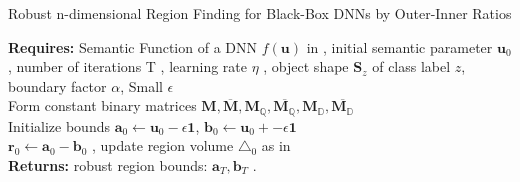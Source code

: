 \begin{algorithm}[t] 
\caption{Robust n-dimensional Region Finding for Black-Box DNNs by Outer-Inner Ratios}\label{alg: black}
\small
\SetAlgoLined
  \textbf{Requires: } Semantic Function of a DNN $f(\mathbf{u})$ in \eqLabel{\ref{eq:f}}, initial semantic parameter $\mathbf{u}_{0}$, number of iterations T , learning rate $\eta$ , object shape $\mathbf{S}_{z}$ of class label $z$, boundary factor $\alpha$, Small $\epsilon$ \\
   Form constant binary matrices $\mathbf{M}, \overline{\mathbf{M}},\mathbf{M}_{\mathbb{Q}},\overline{\mathbf{M}_{\mathbb{Q}}}, \mathbf{M}_{\mathbb{D}},\overline{\mathbf{M}_{\mathbb{D}}} $ \\
   Initialize bounds $\mathbf{a}_{0}\leftarrow \mathbf{u}_{0} - \epsilon \mathbf{1} $, $\mathbf{b}_{0} \leftarrow \mathbf{u}_{0}+- \epsilon \mathbf{1}$ \\
    $\mathbf{r}_{0} \leftarrow \mathbf{a}_{0}-\mathbf{b}_{0} $ , update region volume $ \triangle_{0} $ as in \eqLabel{\ref{eq:n-vol}}\\
    \textbf{Returns: }robust region bounds: $ \mathbf{a}_{T},\mathbf{b}_{T}$ .
\end{algorithm}

